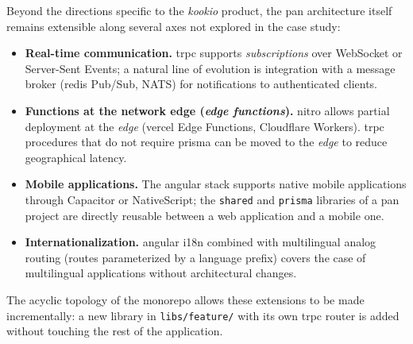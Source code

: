 Beyond the directions specific to the \textit{\gls{kookio}} product, the \gls{pan} architecture itself remains extensible along several axes not explored in the case study:

\begin{itemize}
  \item \textbf{Real-time communication.} \gls{trpc} supports \textit{subscriptions} over WebSocket or Server-Sent Events; a natural line of evolution is integration with a message broker (\gls{redis} Pub/Sub, NATS) for notifications to authenticated clients.

  \item \textbf{Functions at the network edge (\textit{edge functions}).} \gls{nitro} allows partial deployment at the \textit{edge} (\gls{vercel} Edge Functions, Cloudflare Workers). \gls{trpc} procedures that do not require \gls{prisma} can be moved to the \textit{edge} to reduce geographical latency.

  \item \textbf{Mobile applications.} The \gls{angular} stack supports native mobile applications through Capacitor or NativeScript; the \texttt{shared} and \texttt{prisma} libraries of a \gls{pan} project are directly reusable between a \gls{web} application and a mobile one.

  \item \textbf{Internationalization.} \gls{angular} i18n combined with multilingual \gls{analog} routing (routes parameterized by a language prefix) covers the case of multilingual applications without architectural changes.
\end{itemize}

The acyclic topology of the \gls{monorepo} allows these extensions to be made incrementally: a new library in \texttt{libs/feature/} with its own \gls{trpc} router is added without touching the rest of the application.

